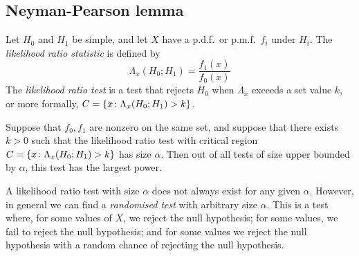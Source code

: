 \subsection{Neyman-Pearson lemma}
Let \( H_0 \) and \( H_1 \) be simple, and let \( X \) have a p.d.f.\ or p.m.f.\ \( f_i \) under \( H_i \).
The \textit{likelihood ratio statistic} is defined by
\[ \Lambda_x(H_0; H_1) = \frac{f_1(x)}{f_0(x)} \]
The \textit{likelihood ratio test} is a test that rejects \( H_0 \) when \( \Lambda_x \) exceeds a set value \( k \), or more formally, \( C = \qty{ x \colon \Lambda_x(H_0; H_1) > k } \).
\begin{lemma}
	Suppose that \( f_0, f_1 \) are nonzero on the same set, and suppose that there exists \( k > 0 \) such that the likelihood ratio test with critical region \( C = \qty{x \colon \Lambda_x(H_0; H_1) > k} \) has size \( \alpha \).
	Then out of all tests of size upper bounded by \( \alpha \), this test has the largest power.
\end{lemma}
\begin{remark}
	A likelihood ratio test with size \( \alpha \) does not always exist for any given \( \alpha \).
	However, in general we can find a \textit{randomised test} with arbitrary size \( \alpha \).
	This is a test where, for some values of \( X \), we reject the null hypothesis; for some values, we fail to reject the null hypothesis; and for some values we reject the null hypothesis with a random chance of rejecting the null hypothesis.
\end{remark}

